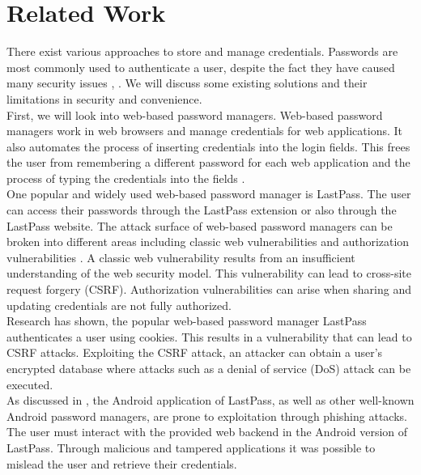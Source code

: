 \section{Related Work} \label{relwork}

There exist various approaches to store and manage credentials. Passwords are most commonly used to authenticate a user, despite the fact they have caused many security issues \cite{DBLP:conf/csfw/JacommeK18}, \cite{WeakPasswords}. We will discuss some existing solutions and their limitations in security and convenience. \\

First, we will look into web-based password managers. Web-based password managers work in web browsers and manage credentials for web applications. It also automates the process of inserting credentials into the login fields. This frees the user from remembering a different password for each web application and the process of typing the credentials into the fields \cite{DBLP:conf/uss/LiHAS14}. \\ %
One popular and widely used web-based password manager is LastPass. The user can access their passwords through the LastPass extension or also through the LastPass website. The attack surface of web-based password managers can be broken into different areas including classic web vulnerabilities and authorization vulnerabilities \cite{DBLP:conf/uss/LiHAS14}. A classic web vulnerability results from an insufficient understanding of the web security model. This vulnerability can lead to cross-site request forgery (CSRF). Authorization vulnerabilities can arise when sharing and updating credentials are not fully authorized. \\
Research \cite{DBLP:conf/uss/LiHAS14} has shown, the popular web-based password manager LastPass authenticates a user using cookies. This results in a vulnerability that can lead to CSRF attacks. Exploiting the CSRF attack, an attacker can obtain a user's encrypted database where attacks such as a denial of service (DoS) attack can be executed. \\
As discussed in \cite{AndroidPhishing}, the Android application of LastPass, as well as other well-known Android password managers, are prone to exploitation through phishing attacks. The user must interact with the provided web backend in the Android version of LastPass. Through malicious and tampered applications it was possible to mislead the user and retrieve their credentials. \\


